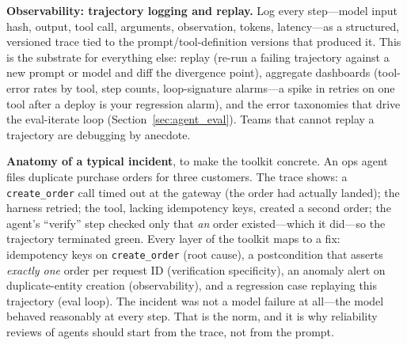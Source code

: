 \textbf{Observability: trajectory logging and replay.} Log every step---model input hash, output, tool call, arguments, observation, tokens, latency---as a structured, versioned trace tied to the prompt/tool-definition versions that produced it. This is the substrate for everything else: replay (re-run a failing trajectory against a new prompt or model and diff the divergence point), aggregate dashboards (tool-error rates by tool, step counts, loop-signature alarms---a spike in retries on one tool after a deploy is your regression alarm), and the error taxonomies that drive the eval-iterate loop (Section~\ref{sec:agent_eval}). Teams that cannot replay a trajectory are debugging by anecdote.

\textbf{Anatomy of a typical incident}, to make the toolkit concrete. An ops agent files duplicate purchase orders for three customers. The trace shows: a \texttt{create\_order} call timed out at the gateway (the order had actually landed); the harness retried; the tool, lacking idempotency keys, created a second order; the agent's ``verify'' step checked only that \textit{an} order existed---which it did---so the trajectory terminated green. Every layer of the toolkit maps to a fix: idempotency keys on \texttt{create\_order} (root cause), a postcondition that asserts \textit{exactly one} order per request ID (verification specificity), an anomaly alert on duplicate-entity creation (observability), and a regression case replaying this trajectory (eval loop). The incident was not a model failure at all---the model behaved reasonably at every step. That is the norm, and it is why reliability reviews of agents should start from the trace, not from the prompt.

